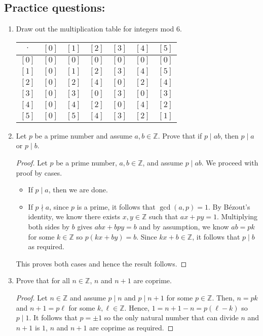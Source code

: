 \documentclass[letterpaper,12pt]{article}
\begin{document}
\subsection*{Practice questions:}
\begin{enumerate}
\item Draw out the multiplication table for integers mod $6$. \par \centering
\begin{tabular}{|c|c|c|c|c|c|c|}
\hline
   $\cdot$  & $[0]$ & $[1]$ & $[2]$ & $[3]$ & $[4]$ & $[5]$  \\
   \hline
   $[0]$  & $[0]$  & $[0]$  & $[0]$  & $[0]$  & $[0]$  & $[0]$  \\
   \hline
   $[1]$ & $[0]$ & $[1]$ & $[2]$ & $[3]$ & $[4]$ & $[5]$ \\
   \hline
   $[2]$ & $[0]$ & $[2]$ & $[4]$ & $[0]$ & $[2]$ & $[4]$ \\
   \hline
   $[3]$ & $[0]$ & $[3]$ & $[0]$ & $[3]$ & $[0]$ & $[3]$ \\
   \hline
   $[4]$ & $[0]$ & $[4]$ & $[2]$ & $[0]$ & $[4]$ & $[2]$ \\
   \hline
   $[5]$ & $[0]$ & $[5]$ & $[4]$ & $[3]$ & $[2]$ & $[1]$ \\
   \hline
\end{tabular}
\item \justifying Let $p$ be a prime number and assume $a,b \in \mathbb{Z}$. Prove that if $p \mid ab$, then $p \mid a$ or $p \mid b$.
\begin{proof}
     Let $p$ be a prime number, $a,b \in \mathbb{Z}$, and assume $p \mid ab$. We proceed with proof by cases. \begin{itemize}
         \item If $p \mid a$, then we are done.
         \item If $p \nmid a$, since $p$ is a prime, it follows that $\gcd (a,p) = 1$. By Bézout's identity, we know there exists $x,y \in \mathbb{Z}$ such that $ax + py = 1$. Multiplying both sides by $b$ gives $abx + bpy =b$ and by assumption, we know $ab = pk$ for some $k \in \mathbb{Z}$ so $p(kx + by) = b $. Since $kx + b \in \mathbb{Z}$, it follows that $p \mid b$ as required.
     \end{itemize}
     This proves both cases and hence the result follows.
\end{proof}
\item Prove that for all $n \in \mathbb{Z}$, $n$ and $n+1$ are coprime.
\begin{proof}
    Let $n \in \mathbb{Z}$ and assume $p \mid n$ and $p \mid n+1$ for some $p \in \mathbb{Z}$. Then, $n = pk$ and $n+1 = p\ell$ for some $k, \ell \in \mathbb{Z}$. Hence, $1= n+1 - n = p(\ell - k)$ so $p \mid 1$. It follows that $p = \pm 1$ so the only natural number that can divide $n$ and $n+1$ is $1$, $n$ and $n+1$ are coprime as required.

\end{proof}
\end{enumerate}
\end{document}
